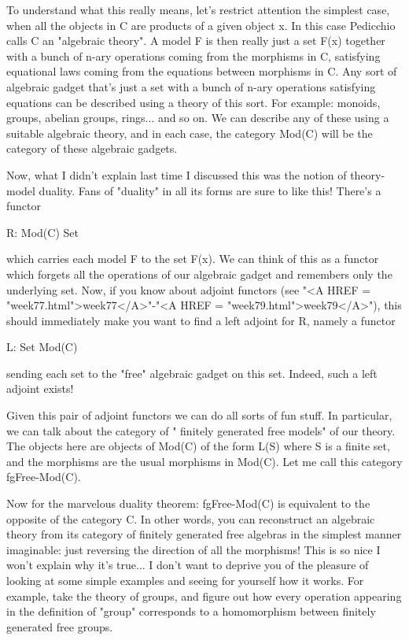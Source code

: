 To understand what this really means, let's restrict attention
the simplest case, when all the objects in C are products of a
given object x.  In this case Pedicchio calls C an "algebraic
theory".  A model F is then really just a set F(x) together 
with a bunch of n-ary operations coming from the morphisms in C, 
satisfying equational laws coming from the equations between 
morphisms in C.  Any sort of algebraic gadget that's just
a set with a bunch of n-ary operations satisfying equations can
be described using a theory of this sort.  For example: monoids, 
groups, abelian groups, rings... and so on.  We can describe
any of these using a suitable algebraic theory, and in each case, 
the category Mod(C) will be the category of these algebraic gadgets.

Now, what I didn't explain last time I discussed this was the 
notion of theory-model duality.  Fans of "duality" in all its 
forms are sure to like this!  There's a functor

R: Mod(C) \to  Set

which carries each model F to the set F(x).  We can think of this
as a functor which forgets all the operations of our algebraic
gadget and remembers only the underlying set.  Now, if you know
about adjoint functors (see "<A HREF = "week77.html">week77</A>"-"<A HREF = "week79.html">week79</A>"), this should 
immediately make you want to find a left adjoint for R, namely 
a functor 

L: Set \to  Mod(C)

sending each set to the "free" algebraic gadget on this set.
Indeed, such a left adjoint exists!

Given this pair of adjoint functors we can do all sorts of fun 
stuff.  In particular, we can talk about the category of "
finitely generated free models" 
of our theory.  The objects here are objects of Mod(C)
of the form L(S) where S is a finite set, and the morphisms are the usual 
morphisms in Mod(C).  Let me call this category fgFree-Mod(C).

Now for the marvelous duality theorem: fgFree-Mod(C) is equivalent
to the opposite of the category C.   In other words, you can 
reconstruct an algebraic theory from its category of finitely
generated free algebras in the simplest manner imaginable: just 
reversing the direction
of all the morphisms!  This is so nice I won't explain why it's
true... I don't want to deprive you of the pleasure of looking
at some simple examples and seeing for yourself how it works.  
For example, take the theory of groups, and figure out how every
operation appearing in the definition of "group" corresponds to
a homomorphism between finitely generated free groups.

